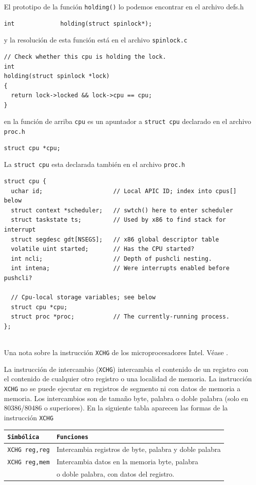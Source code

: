 \documentclass{article}
\begin{document}
El prototipo de la funci\'on {\tt holding()} lo podemos encontrar 
en el archivo defs.h
\begin{verbatim}
int             holding(struct spinlock*);
\end{verbatim}
y la resoluci\'on de esta funci\'on est\'a en el archivo {\tt spinlock.c}
\begin{verbatim}
// Check whether this cpu is holding the lock.
int
holding(struct spinlock *lock)
{
  return lock->locked && lock->cpu == cpu;
}
\end{verbatim}
en la funci\'on de arriba {\tt cpu} es un apuntador a {\tt struct cpu} 
declarado en el archivo {\tt proc.h}
\begin{verbatim}
struct cpu *cpu;
\end{verbatim}
La {\tt struct cpu} esta declarada tambi\'en en el archivo {\tt proc.h}
\begin{verbatim}
struct cpu {
  uchar id;                    // Local APIC ID; index into cpus[] below
  struct context *scheduler;   // swtch() here to enter scheduler
  struct taskstate ts;         // Used by x86 to find stack for interrupt
  struct segdesc gdt[NSEGS];   // x86 global descriptor table
  volatile uint started;       // Has the CPU started?
  int ncli;                    // Depth of pushcli nesting.
  int intena;                  // Were interrupts enabled before pushcli?
  
  // Cpu-local storage variables; see below
  struct cpu *cpu;
  struct proc *proc;           // The currently-running process.
};
\end{verbatim}

\\
Una nota sobre la instrucci\'on {\tt XCHG} de los microprocesadores 
Intel. V\'ease \cite{Brey}.\par
{}\par
\noindent La instrucci\'on de intercambio ({\tt XCHG}) intercambia 
el contenido de un registro con el contenido de cualquier otro 
registro o una localidad de memoria. La instrucci\'on {\tt XCHG} 
no se puede ejecutar en registros de segmento ni con datos de 
memoria a memoria. Los intercambios son de tama\~no byte, palabra 
o doble palabra (solo en 80386/80486 o superiores). En la siguiente 
tabla aparecen las formas de la instrucci\'on {\tt XCHG}
\begin{center}
\begin{tabular}{|l|l|}\hline
{\tt Simb\'olica}&{\tt Funciones}\\\hline
{\tt XCHG reg,reg}&Intercambia registros de byte, palabra y 
doble palabra\\\hline
{\tt XCHG reg,mem}&Intercambia datos en la memoria byte, palabra \\
&o doble palabra, con datos del registro.\\\hline
\end{tabular}
\end{center}
\end{document}
